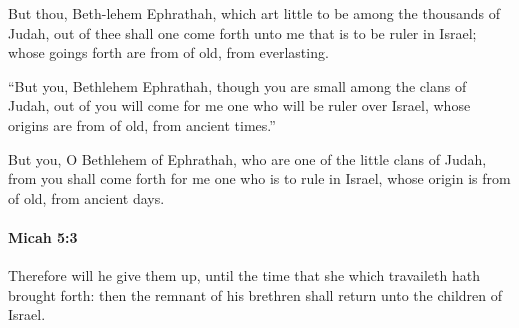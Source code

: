 			\begin{versebox}
					\item[BHS] 
					\item[LXX] 
					\item[ASV] But thou, Beth-lehem Ephrathah, which art little to be among the thousands of Judah, out of thee shall one come forth unto me that is to be ruler in Israel; whose goings forth are from of old, from everlasting.
					\item[NIV] “But you, Bethlehem Ephrathah, though you are small among the clans of Judah, out of you will come for me one who will be ruler over Israel, whose origins are from of old, from ancient times.”
					\item[NRSV] But you, O Bethlehem of Ephrathah, who are one of the little clans of Judah, from you shall come forth for me one who is to rule in Israel, whose origin is from of old, from ancient days.
			\end{versebox}

		\paragraph{Micah 5:3} %
			\label{MICAH-5-3}

			Therefore will he give them up, until the time that she which travaileth hath brought forth: then the remnant of his brethren shall return unto the children of Israel.


